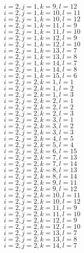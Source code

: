\documentclass[14pt]{article}
\begin{document}
    $i=2,j=1,k=9,l=12 $ \\ 
    $i=2,j=1,k=10,l=11 $ \\ 
    $i=2,j=1,k=10,l=12 $ \\ 
    $i=2,j=1,k=11,l=9 $ \\ 
    $i=2,j=1,k=11,l=10 $ \\ 
    $i=2,j=1,k=12,l=9 $ \\ 
    $i=2,j=1,k=12,l=10 $ \\ 
    $i=2,j=1,k=13,l=7 $ \\ 
    $i=2,j=1,k=13,l=8 $ \\ 
    $i=2,j=1,k=14,l=7 $ \\ 
    $i=2,j=1,k=14,l=8 $ \\ 
    $i=2,j=1,k=15,l=6 $ \\ 
    $i=2,j=2,k=1,l=1 $ \\ 
    $i=2,j=2,k=1,l=2 $ \\ 
    $i=2,j=2,k=1,l=3 $ \\ 
    $i=2,j=2,k=2,l=1 $ \\ 
    $i=2,j=2,k=2,l=2 $ \\ 
    $i=2,j=2,k=2,l=3 $ \\ 
    $i=2,j=2,k=3,l=1 $ \\ 
    $i=2,j=2,k=3,l=2 $ \\ 
    $i=2,j=2,k=3,l=3 $ \\ 
    $i=2,j=2,k=4,l=5 $ \\ 
    $i=2,j=2,k=5,l=4 $ \\ 
    $i=2,j=2,k=6,l=15 $ \\ 
    $i=2,j=2,k=7,l=13 $ \\ 
    $i=2,j=2,k=7,l=14 $ \\ 
    $i=2,j=2,k=8,l=13 $ \\ 
    $i=2,j=2,k=8,l=14 $ \\ 
    $i=2,j=2,k=9,l=11 $ \\ 
    $i=2,j=2,k=9,l=12 $ \\ 
    $i=2,j=2,k=10,l=11 $ \\ 
    $i=2,j=2,k=10,l=12 $ \\ 
    $i=2,j=2,k=11,l=9 $ \\ 
    $i=2,j=2,k=11,l=10 $ \\ 
    $i=2,j=2,k=12,l=9 $ \\ 
    $i=2,j=2,k=12,l=10 $ \\ 
    $i=2,j=2,k=13,l=7 $ \\ 
    $i=2,j=2,k=13,l=8 $ \\ 
    $i=2,j=2,k=14,l=7 $ \\ 
\end{document}
